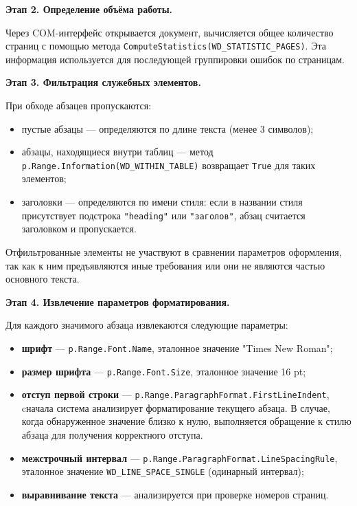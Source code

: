 \textbf{Этап 2. Определение объёма работы.}

Через COM-интерфейс открывается документ, вычисляется общее количество страниц с помощью метода \texttt{ComputeStatistics(WD\_STATISTIC\_PAGES)}. Эта информация используется для последующей группировки ошибок по страницам.

\textbf{Этап 3. Фильтрация служебных элементов.}

При обходе абзацев пропускаются:

\begin{itemize}
	\item пустые абзацы — определяются по длине текста (менее 3 символов);
	\item абзацы, находящиеся внутри таблиц — метод \texttt{p.Range.Information(WD\_WITHIN\_TABLE)} возвращает \texttt{True} для таких элементов;
	\item заголовки — определяются по имени стиля: если в названии стиля присутствует подстрока \texttt{"heading"} или \texttt{"заголов"}, абзац считается заголовком и пропускается.
\end{itemize}

Отфильтрованные элементы не участвуют в сравнении параметров оформления, так как к ним предъявляются иные требования или они не являются частью основного текста.

\textbf{Этап 4. Извлечение параметров форматирования.}

Для каждого значимого абзаца извлекаются следующие параметры:

\begin{itemize}
	\item \textbf{шрифт} — \texttt{p.Range.Font.Name}, эталонное значение "Times New Roman";
	\item \textbf{размер шрифта} — \texttt{p.Range.Font.Size}, эталонное значение 16 pt;
	\item \textbf{отступ первой строки} — \texttt{p.Range.ParagraphFormat.FirstLineIndent}, cначала система анализирует форматирование текущего абзаца. В случае, когда обнаруженное значение близко к нулю, выполняется обращение к стилю абзаца для получения корректного отступа.
	\item \textbf{межстрочный интервал} — \texttt{p.Range.ParagraphFormat.LineSpacingRule}, эталонное значение \texttt{WD\_LINE\_SPACE\_SINGLE} (одинарный интервал);
	\item \textbf{выравнивание текста} — анализируется при проверке номеров страниц.
\end{itemize}

